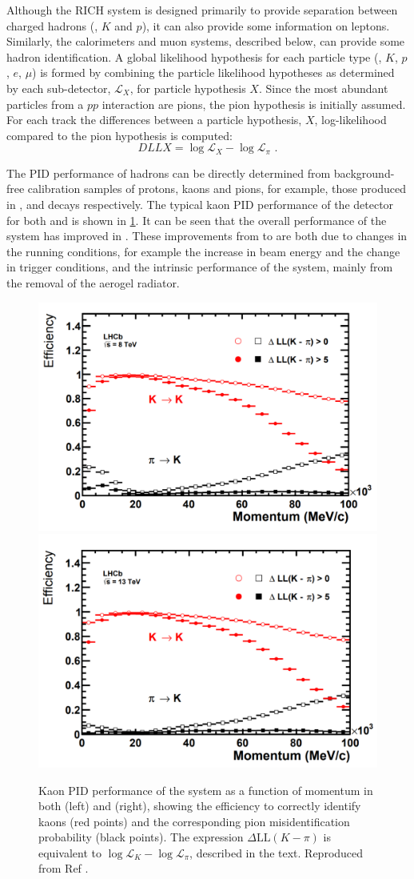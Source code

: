 Although the RICH system is designed primarily to provide separation between charged hadrons (\pion, $K$ and $p$), it can also provide some information on leptons. Similarly, the calorimeters and muon systems, described below, can provide some hadron identification. A global likelihood hypothesis for each particle type (\pion, $K$, $p$, $e$, $\mu$) is formed by combining the particle likelihood hypotheses as determined by each sub-detector, $\mathcal{L}_X$, for particle hypothesis $X$. Since the most abundant particles from a $pp$ interaction are pions, the pion hypothesis is initially assumed. For each track the differences between a particle hypothesis, $X$, log-likelihood compared to the pion hypothesis is computed:
\begin{equation}
DLLX = \log{\mathcal{L}_X} - \log{\mathcal{L}_{\pi}} \text{ .}
\end{equation}

The PID performance of hadrons can be directly determined from background-free calibration samples of protons, kaons and pions, for example, those produced in \Lz, \Dstarm and \KS decays respectively. The typical kaon PID performance of the \lhcb detector for both \runone and \runtwo is shown in \fig\ref{richperformance}. It can be seen that the overall performance of the \rich system has improved in \runtwo. These improvements from \runone to \runtwo are both due to changes in the running conditions, for example the increase in beam energy and the change in trigger conditions, and the intrinsic performance of the \rich system, mainly from the removal of the aerogel radiator.

\begin{figure}
\includegraphics[width=0.5\linewidth]{figures/detector/richperformance_run1.pdf}
\includegraphics[width=0.5\linewidth]{figures/detector/richperformance_run2.pdf}
\caption{Kaon PID performance of the \rich system as a function of momentum in both \runone (left) and \runtwo (right), showing the efficiency to correctly identify kaons (red points) and the corresponding pion misidentification probability (black points). The expression $\Delta \text{LL}(K - \pi)$ is equivalent to $\log{\mathcal{L}_K} - \log{\mathcal{L}_{\pi}}$, described in the text. Reproduced from Ref \cite{richrun2}.}
\label{richperformance}
\end{figure}

